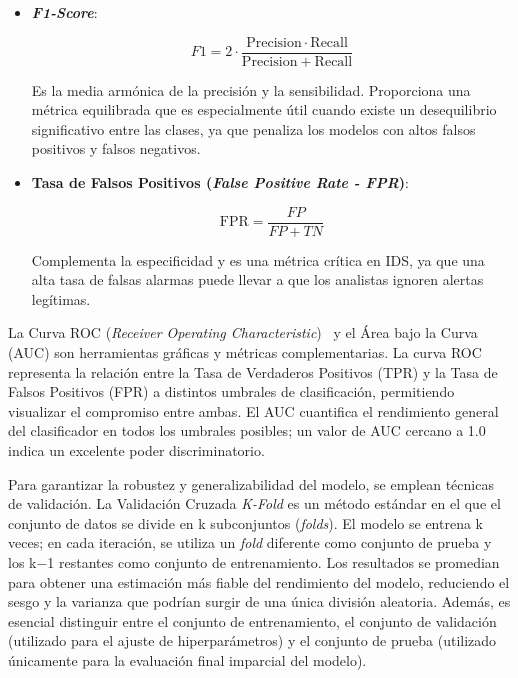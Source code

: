 \begin{itemize}
    \item\textbf{\textit{F1-Score}}:

      \begin{equation}
        F1 = 2 \cdot \frac{\mathrm{Precision} \cdot \mathrm{Recall}}{\mathrm{Precision} + \mathrm{Recall}}
        \label{eq:f1}
      \end{equation}
    
     Es la media armónica de la precisión y la sensibilidad. Proporciona una métrica equilibrada que es especialmente útil cuando existe un desequilibrio significativo entre las clases, ya que penaliza los modelos con altos falsos positivos y falsos negativos.
    
    \item\textbf{Tasa de Falsos Positivos (\textit{False Positive Rate - FPR})}: 

      \begin{equation}
        \mathrm{FPR} = \frac{FP}{FP + TN}
        \label{eq:fpr}
      \end{equation}
    

     Complementa la especificidad y es una métrica crítica en IDS, ya que una alta tasa de falsas alarmas puede llevar a que los analistas ignoren alertas legítimas.

\end{itemize}
La Curva ROC (\textit{Receiver Operating Characteristic})~\cite{datacampAUC} y el Área bajo la Curva (AUC) son herramientas gráficas y métricas complementarias. La curva ROC representa la relación entre la Tasa de Verdaderos Positivos (TPR) y la Tasa de Falsos Positivos (FPR) a distintos umbrales de clasificación, permitiendo visualizar el compromiso entre ambas. El AUC cuantifica el rendimiento general del clasificador en todos los umbrales posibles; un valor de AUC cercano a 1.0 indica un excelente poder discriminatorio.

Para garantizar la robustez y generalizabilidad del modelo, se emplean técnicas de validación. La Validación Cruzada \textit{K-Fold} es un método estándar en el que el conjunto de datos se divide en k subconjuntos (\textit{folds}). El modelo se entrena k veces; en cada iteración, se utiliza un \textit{fold} diferente como conjunto de prueba y los k−1 restantes como conjunto de entrenamiento. Los resultados se promedian para obtener una estimación más fiable del rendimiento del modelo, reduciendo el sesgo y la varianza que podrían surgir de una única división aleatoria. Además, es esencial distinguir entre el conjunto de entrenamiento, el conjunto de validación (utilizado para el ajuste de hiperparámetros) y el conjunto de prueba (utilizado únicamente para la evaluación final imparcial del modelo).

